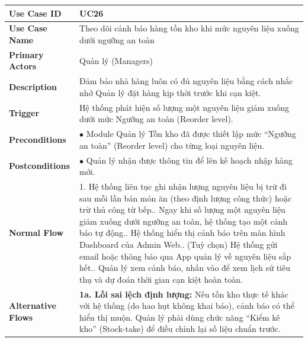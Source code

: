\begin{longtable}{|p{3.5cm}|p{12.5cm}|}
\hline
\textbf{Use Case ID} & UC26 \\ \hline
\textbf{Use Case Name} & Theo dõi cảnh báo hàng tồn kho khi mức nguyên liệu xuống dưới ngưỡng an toàn \\ \hline
\textbf{Primary Actors} & Quản lý (Managers) \\ \hline
\textbf{Description} & Đảm bảo nhà hàng luôn có đủ nguyên liệu bằng cách nhắc nhở Quản lý đặt hàng kịp thời trước khi cạn kiệt. \\ \hline
\textbf{Trigger} & Hệ thống phát hiện số lượng một nguyên liệu giảm xuống dưới mức Ngưỡng an toàn (Reorder level). \\ \hline
\textbf{Preconditions} & $\bullet$ Module Quản lý Tồn kho đã được thiết lập mức ``Ngưỡng an toàn'' (Reorder level) cho từng loại nguyên liệu. \\ \hline
\textbf{Postconditions} & $\bullet$ Quản lý nhận được thông tin để lên kế hoạch nhập hàng mới. \\ \hline
\textbf{Normal Flow} &
1. Hệ thống liên tục ghi nhận lượng nguyên liệu bị trừ đi sau mỗi lần bán món ăn (theo định lượng công thức) hoặc trừ thủ công từ bếp.\newline
2. Ngay khi số lượng một nguyên liệu giảm xuống dưới ngưỡng an toàn, hệ thống tạo một cảnh báo tự động.\newline
3. Hệ thống hiển thị cảnh báo trên màn hình Dashboard của Admin Web.\newline
4. (Tuỳ chọn) Hệ thống gửi email hoặc thông báo qua App quản lý về nguyên liệu sắp hết.\newline
5. Quản lý xem cảnh báo, nhấn vào để xem lịch sử tiêu thụ và dự đoán thời gian cạn kiệt hoàn toàn. \\ \hline
\textbf{Alternative Flows} &
\textbf{1a. Lỗi sai lệch định lượng:} Nếu tồn kho thực tế khác với hệ thống (do hao hụt không khai báo), cảnh báo có thể hiển thị muộn. Quản lý phải dùng chức năng ``Kiểm kê kho'' (Stock-take) để điều chỉnh lại số liệu chuẩn trước. \\ \hline
\end{longtable}

